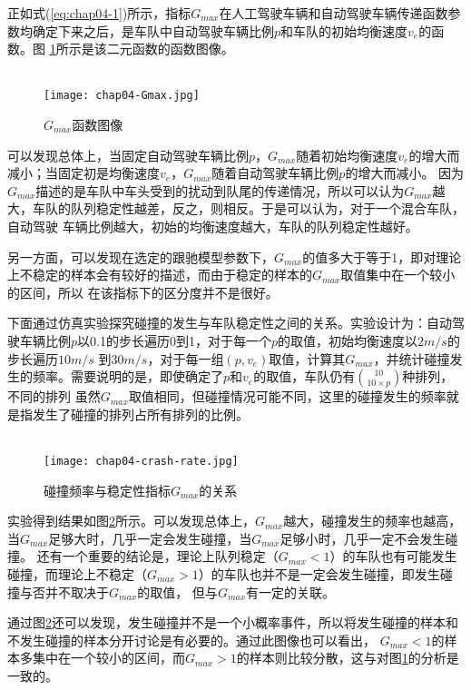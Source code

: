 正如式(\ref{eq:chap04-1})所示，指标$G_{max}$在人工驾驶车辆和自动驾驶车辆传递函数参数均确定下来之后，是车队中自动驾驶车辆比例$p$和车队的初始均衡速度$v_e$的函数。图
\ref{fig:chap04-1}所示是该二元函数的函数图像。 \\\\

\begin{figure}
    \centering
    \texttt{[image: chap04-Gmax.jpg]}
    \caption{$G_{max}$函数图像}
    \label{fig:chap04-1}
\end{figure}

可以发现总体上，当固定自动驾驶车辆比例$p$，$G_{max}$随着初始均衡速度$v_e$的增大而减小；当固定初是均衡速度$v_e$，$G_{max}$随着自动驾驶车辆比例$p$的增大而减小。
因为$G_{max}$描述的是车队中车头受到的扰动到队尾的传递情况，所以可以认为$G_{max}$越大，车队的队列稳定性越差，反之，则相反。于是可以认为，对于一个混合车队，自动驾驶
车辆比例越大，初始的均衡速度越大，车队的队列稳定性越好。

另一方面，可以发现在选定的跟驰模型参数下，$G_{max}$的值多大于等于1，即对理论上不稳定的样本会有较好的描述，而由于稳定的样本的$G_{max}$取值集中在一个较小的区间，所以
在该指标下的区分度并不是很好。

下面通过仿真实验探究碰撞的发生与车队稳定性之间的关系。实验设计为：自动驾驶车辆比例$p$以0.1的步长遍历0到1，对于每一个$p$的取值，初始均衡速度以$2m/s$的步长遍历$10m/s$
到$30m/s$，对于每一组$(p, v_e)$取值，计算其$G_{max}$，并统计碰撞发生的频率。需要说明的是，即使确定了$p$和$v_e$的取值，车队仍有$\binom{10}{10\times p}$种排列，不同的排列
虽然$G_{max}$取值相同，但碰撞情况可能不同，这里的碰撞发生的频率就是指发生了碰撞的排列占所有排列的比例。 \\\\

\begin{figure}
    \centering
    \texttt{[image: chap04-crash-rate.jpg]}
    \caption{碰撞频率与稳定性指标$G_{max}$的关系}
    \label{fig:chap04-2}
\end{figure}

实验得到结果如图\ref{fig:chap04-2}所示。可以发现总体上，$G_{max}$越大，碰撞发生的频率也越高，当$G_{max}$足够大时，几乎一定会发生碰撞，当$G_{max}$足够小时，几乎一定不会发生碰撞。
还有一个重要的结论是，理论上队列稳定（$G_{max} < 1$）的车队也有可能发生碰撞，而理论上不稳定（$G_{max} > 1$）的车队也并不是一定会发生碰撞，即发生碰撞与否并不取决于$G_{max}$的取值，
但与$G_{max}$有一定的关联。

通过图\ref{fig:chap04-2}还可以发现，发生碰撞并不是一个小概率事件，所以将发生碰撞的样本和不发生碰撞的样本分开讨论是有必要的。通过此图像也可以看出，
$G_{max} < 1$的样本多集中在一个较小的区间，而$G_{max} > 1$的样本则比较分散，这与对图\ref{fig:chap04-1}的分析是一致的。

